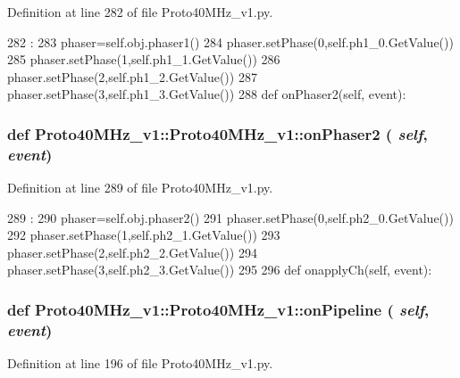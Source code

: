 Definition at line 282 of file Proto40MHz\_\-v1.py.


\begin{DoxyCode}
282                               :
283         phaser=self.obj.phaser1()
284         phaser.setPhase(0,self.ph1_0.GetValue())
285         phaser.setPhase(1,self.ph1_1.GetValue())
286         phaser.setPhase(2,self.ph1_2.GetValue())
287         phaser.setPhase(3,self.ph1_3.GetValue())
288 
    def onPhaser2(self, event):
\end{DoxyCode}
\hypertarget{classProto40MHz__v1_1_1Proto40MHz__v1_acd4917962afdd4301da0b992b4299db3}{
\subsubsection[{onPhaser2}]{\setlength{\rightskip}{0pt plus 5cm}def Proto40MHz\_\-v1::Proto40MHz\_\-v1::onPhaser2 ( {\em self}, \/   {\em event})}}
\label{classProto40MHz__v1_1_1Proto40MHz__v1_acd4917962afdd4301da0b992b4299db3}


Definition at line 289 of file Proto40MHz\_\-v1.py.


\begin{DoxyCode}
289                               :
290         phaser=self.obj.phaser2()
291         phaser.setPhase(0,self.ph2_0.GetValue())
292         phaser.setPhase(1,self.ph2_1.GetValue())
293         phaser.setPhase(2,self.ph2_2.GetValue())
294         phaser.setPhase(3,self.ph2_3.GetValue())
295 
296 
    def onapplyCh(self, event):
\end{DoxyCode}
\hypertarget{classProto40MHz__v1_1_1Proto40MHz__v1_aea2e8d77a2c933128c6824dd4e2ff2f0}{
\subsubsection[{onPipeline}]{\setlength{\rightskip}{0pt plus 5cm}def Proto40MHz\_\-v1::Proto40MHz\_\-v1::onPipeline ( {\em self}, \/   {\em event})}}
\label{classProto40MHz__v1_1_1Proto40MHz__v1_aea2e8d77a2c933128c6824dd4e2ff2f0}


Definition at line 196 of file Proto40MHz\_\-v1.py.



